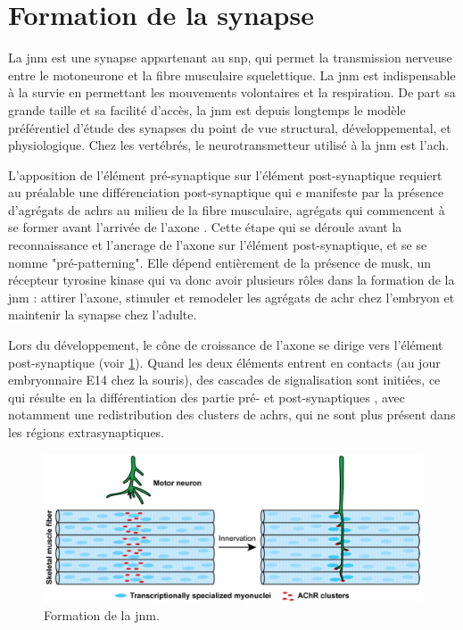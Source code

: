 \section{Formation de la synapse}
	\label{sec:IntroSynapse}
	La \gls{jnm} est une synapse appartenant au \gls{snp}, qui permet la transmission nerveuse entre le motoneurone et la fibre musculaire squelettique. La \gls{jnm} est indispensable à la survie en permettant les mouvements volontaires et la respiration. De part sa grande taille et sa facilité d'accès, la \gls{jnm} est depuis longtemps le modèle préférentiel d'étude des synapses du point de vue structural, développemental, et physiologique. Chez les vertébrés, le neurotransmetteur utilisé à la \gls{jnm} est l'\gls{ach}. 
	
	L'apposition de l'élément pré-synaptique sur l'élément post-synaptique requiert au préalable une différenciation post-synaptique qui e manifeste par la présence d'agrégats de \glspl{achr} au milieu de la fibre musculaire, agrégats qui commencent à se former avant l'arrivée de l'axone \cite{Wu2010a, Gordon2012}. Cette étape qui se déroule avant la reconnaissance et l'ancrage de l'axone sur l'élément post-synaptique, et se se nomme "pré-patterning". Elle dépend entièrement de la présence de \acrshort{musk}, un récepteur tyrosine kinase qui va donc avoir plusieurs rôles dans la formation de la \gls{jnm} : attirer l'axone, stimuler et remodeler les agrégats de \gls{achr} chez l'embryon et maintenir la synapse chez l'adulte.
	
	Lors du développement, le cône de croissance de l'axone se dirige vers l'élément post-synaptique (voir \cref{fig:FormaJNM}). Quand les deux éléments entrent en contacts (au jour embryonnaire E14 chez la souris), des cascades de signalisation sont initiées, ce qui résulte en la différentiation des partie pré- et post-synaptiques \cite{Sanes1999}, avec notamment une redistribution des clusters de \glspl{achr}, qui ne sont plus présent dans les régions extrasynaptiques.
	
	\begin{figure}[h]
		\includegraphics[width=\textwidth]{./Images/formation_jnm.png}
		\caption{Formation de la \gls{jnm}.} 
		\label{fig:FormaJNM}
	\end{figure}
	
